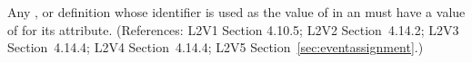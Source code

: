 Any \Compartment, \Species or \Parameter definition whose identifier is used
as the value of  in an \EventAssignment must have a value of
 for its  attribute.  (References: L2V1 Section
4.10.5; L2V2 Section~4.14.2; L2V3 Section~4.14.4; L2V4
Section~4.14.4; L2V5 Section~\ref{sec:eventassignment}.)
